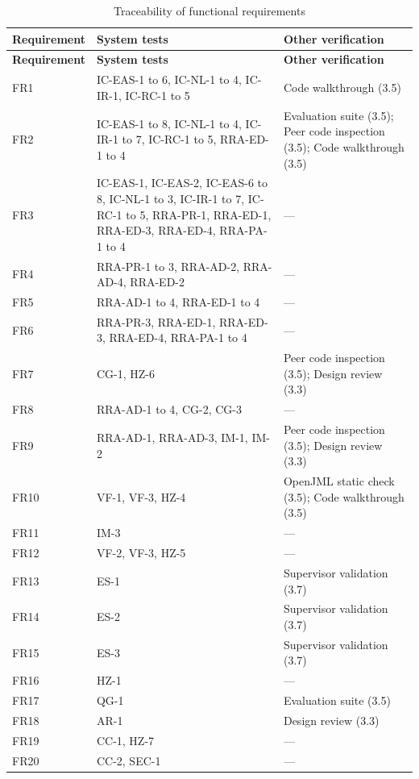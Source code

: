\documentclass[12pt, titlepage]{article}
\begin{document}
\begin{longtable}{>{\raggedright\arraybackslash}p{}>{\raggedright\arraybackslash}p{}>{\raggedright\arraybackslash}p{}}
\caption{Traceability of functional requirements} \label{tab:trace-fr} \\
\toprule
\textbf{Requirement} & \textbf{System tests} & \textbf{Other verification} \\
\midrule
\endfirsthead
\toprule
\textbf{Requirement} & \textbf{System tests} & \textbf{Other verification} \\
\midrule
\endhead
\bottomrule
\endfoot
FR1 & IC-EAS-1 to 6, IC-NL-1 to 4, IC-IR-1, IC-RC-1 to 5 & Code walkthrough (3.5) \\
FR2 & IC-EAS-1 to 8, IC-NL-1 to 4, IC-IR-1 to 7, IC-RC-1 to 5, RRA-ED-1 to 4 & Evaluation suite (3.5); Peer code inspection (3.5); Code walkthrough (3.5) \\
FR3 & IC-EAS-1, IC-EAS-2, IC-EAS-6 to 8, IC-NL-1 to 3, IC-IR-1 to 7, IC-RC-1 to 5, RRA-PR-1, RRA-ED-1, RRA-ED-3, RRA-ED-4, RRA-PA-1 to 4 & --- \\
FR4 & RRA-PR-1 to 3, RRA-AD-2, RRA-AD-4, RRA-ED-2 & --- \\
FR5 & RRA-AD-1 to 4, RRA-ED-1 to 4 & --- \\
FR6 & RRA-PR-3, RRA-ED-1, RRA-ED-3, RRA-ED-4, RRA-PA-1 to 4 & --- \\
FR7 & CG-1, HZ-6 & Peer code inspection (3.5); Design review (3.3) \\
FR8 & RRA-AD-1 to 4, CG-2, CG-3 & --- \\
FR9 & RRA-AD-1, RRA-AD-3, IM-1, IM-2 & Peer code inspection (3.5); Design review (3.3) \\
FR10 & VF-1, VF-3, HZ-4 & OpenJML static check (3.5); Code walkthrough (3.5) \\
FR11 & IM-3 & --- \\
FR12 & VF-2, VF-3, HZ-5 & --- \\
FR13 & ES-1 & Supervisor validation (3.7) \\
FR14 & ES-2 & Supervisor validation (3.7) \\
FR15 & ES-3 & Supervisor validation (3.7) \\
FR16 & HZ-1 & --- \\
FR17 & QG-1 & Evaluation suite (3.5) \\
FR18 & AR-1 & Design review (3.3) \\
FR19 & CC-1, HZ-7 & --- \\
FR20 & CC-2, SEC-1 & --- \\
\end{longtable}
\end{document}
